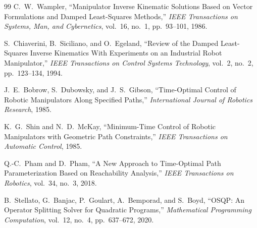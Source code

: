 \documentclass[journal]{IEEEtran}
\begin{document}
\begin{thebibliography}{99}
C.~W.~Wampler, ``Manipulator Inverse Kinematic Solutions Based on Vector
Formulations and Damped Least-Squares Methods,'' \emph{IEEE Transactions
on Systems, Man, and Cybernetics}, vol.~16, no.~1, pp.~93--101, 1986.

S.~Chiaverini, B.~Siciliano, and O.~Egeland, ``Review of the Damped
Least-Squares Inverse Kinematics With Experiments on an Industrial Robot
Manipulator,'' \emph{IEEE Transactions on Control Systems Technology},
vol.~2, no.~2, pp.~123--134, 1994.

J.~E.~Bobrow, S.~Dubowsky, and J.~S.~Gibson, ``Time-Optimal Control of
Robotic Manipulators Along Specified Paths,'' \emph{International Journal
of Robotics Research}, 1985.

K.~G.~Shin and N.~D.~McKay, ``Minimum-Time Control of Robotic Manipulators
with Geometric Path Constraints,'' \emph{IEEE Transactions on Automatic
Control}, 1985.

Q.-C.~Pham and D.~Pham, ``A New Approach to Time-Optimal Path
Parameterization Based on Reachability Analysis,'' \emph{IEEE
Transactions on Robotics}, vol.~34, no.~3, 2018.

B.~Stellato, G.~Banjac, P.~Goulart, A.~Bemporad, and S.~Boyd, ``OSQP: An
Operator Splitting Solver for Quadratic Programs,'' \emph{Mathematical
Programming Computation}, vol.~12, no.~4, pp.~637--672, 2020.

\end{thebibliography}
\end{document}
